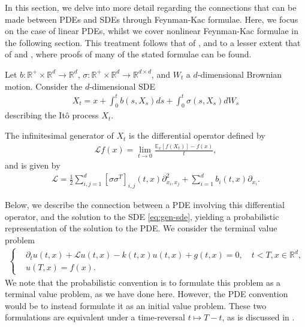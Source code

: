 In this section, we delve into more detail regarding the connections that can be made between PDEs and SDEs through Feynman-Kac formulae. Here, we focus on the case of linear PDEs, whilst we cover nonlinear Feynman-Kac formulae in the following section. This treatment follows that of \cite{gobet2016monte}, and to a lesser extent that of \cite{oksendal2003stochastic} and \cite{klebaner2012introduction}, where proofs of many of the stated formulae can be found. 

Let $b:\mathbb{R}^+ \times \mathbb{R}^d \rightarrow \mathbb{R}^d$, $\sigma:\mathbb{R}^+ \times \mathbb{R}^d \rightarrow \mathbb{R}^{d \times d}$, and $W_t$ a $d$-dimensional Brownian motion. Consider the $d$-dimensional SDE
%
\begin{align}
    \label{eq:gen-sde}
X_t = x + \int_0^t b(s,X_s) ds + \int_0^t \sigma(s,X_s)dW_s
\end{align}
%
describing the Itô process $X_t$. 

The infinitesimal generator of $X_t$ is the differential operator defined by 
%
\begin{align} 
    \mathcal{L}f(x) = \lim_{t\rightarrow 0} \frac{\mathbb{E}_x[f(X_t)]-f(x)}{t},
\end{align}
%
and is given by
%
\begin{align}
    \label{eq:generator-operator}
    \mathcal{L} = \frac{1}{2} \sum_{i,j=1}^d [\sigma \sigma^T]_{i,j}(t,x) \partial_{x_i,x_j}^2 + \sum_{i=1}^d b_i(t,x) \partial_{x_i}.
\end{align}
%

Below, we describe the connection between a PDE involving this differential operator, and the solution to the SDE \autoref{eq:gen-sde}, yielding a probabilistic representation of the solution to the PDE. We consider the terminal value problem
%
\begin{align}
    \label{eq:backward-pde}
    \begin{cases}
    &\partial_t u(t,x) + \mathcal{L}u(t,x) - k(t,x)u(t,x) + g(t,x) = 0, \quad t<T,x \in \mathbb{R}^d, \\
    &u(T,x) = f(x).
    \end{cases}
\end{align}
%
We note that the probabilistic convention is to formulate this problem as a terminal value problem, as we have done here. However, the PDE convention would be to instead formulate it as an initial value problem. These two formulations are equivalent under a time-reversal $t \mapsto T-t$, as is discussed in \cite{gobet2016monte}. 


